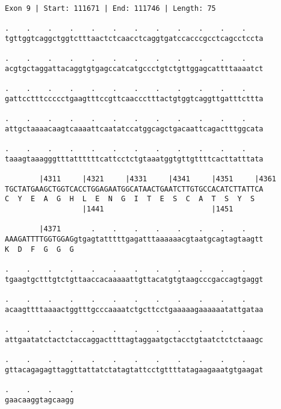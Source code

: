 \documentclass{article}
\begin{document}
\begin{Verbatim}
Exon 9 | Start: 111671 | End: 111746 | Length: 75
 
.    .    .    .    .    .    .    .    .    .    .    .    
tgttggtcaggctggtctttaactctcaacctcaggtgatccacccgcctcagcctccta
  
.    .    .    .    .    .    .    .    .    .    .    .    
acgtgctaggattacaggtgtgagccatcatgccctgtctgttggagcattttaaaatct
  
.    .    .    .    .    .    .    .    .    .    .    .    
gattcctttccccctgaagtttccgttcaaccctttactgtggtcaggttgatttcttta
  
.    .    .    .    .    .    .    .    .    .    .    .    
attgctaaaacaagtcaaaattcaatatccatggcagctgacaattcagactttggcata
  
.    .    .    .    .    .    .    .    .    .    .    .    
taaagtaaagggtttattttttcattcctctgtaaatggtgttgttttcacttatttata
  
        |4311     |4321     |4331     |4341     |4351     |4361
TGCTATGAAGCTGGTCACCTGGAGAATGGCATAACTGAATCTTGTGCCACATCTTATTCA
C  Y  E  A  G  H  L  E  N  G  I  T  E  S  C  A  T  S  Y  S  
                  |1441                         |1451       
  
        |4371       .    .    .    .    .    .    .    .    
AAAGATTTTGGTGGAGgtgagtatttttgagatttaaaaaacgtaatgcagtagtaagtt
K  D  F  G  G  G                                            
  
.    .    .    .    .    .    .    .    .    .    .    .    
tgaagtgctttgtctgttaaccacaaaaattgttacatgtgtaagcccgaccagtgaggt
  
.    .    .    .    .    .    .    .    .    .    .    .    
acaagttttaaaactggtttgcccaaaatctgcttcctgaaaaagaaaaaatattgataa
  
.    .    .    .    .    .    .    .    .    .    .    .    
attgaatatctactctaccaggacttttagtaggaatgctacctgtaatctctctaaagc
  
.    .    .    .    .    .    .    .    .    .    .    .    
gttacagagagttaggttattatctatagtattcctgttttatagaagaaatgtgaagat
  
.    .    .    .
gaacaaggtagcaagg
\end{Verbatim}
\newpage
\end{document}

